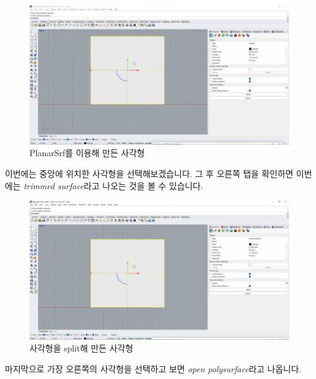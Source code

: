 \documentclass[11pt]{article}
\begin{document}
\begin{figure}[H]
    \includegraphics[width=\textwidth]{./img/mbs_04_SurfRec.png}
    \caption{PlanarSrf를 이용해 만든 사각형}
    \label{fig:mbs_04_SurfRec}
\end{figure}
이번에는 중앙에 위치한 사각형을 선택해보겠습니다. 그 후 오른쪽 탭을 확인하면 이번에는 \textit{trimmed surface}라고 나오는 것을 볼 수 있습니다.

\begin{figure}[H]
    \includegraphics[width=\textwidth]{./img/mbs_05_TrimmedRect.png}
    \caption{사각형을 split해 만든 사각형}
    \label{fig:mbs_05_trimmed}
\end{figure}

마지막으로 가장 오른쪽의 사각형을 선택하고 보면 \textit{open polysurface}라고 나옵니다.
\end{document}
